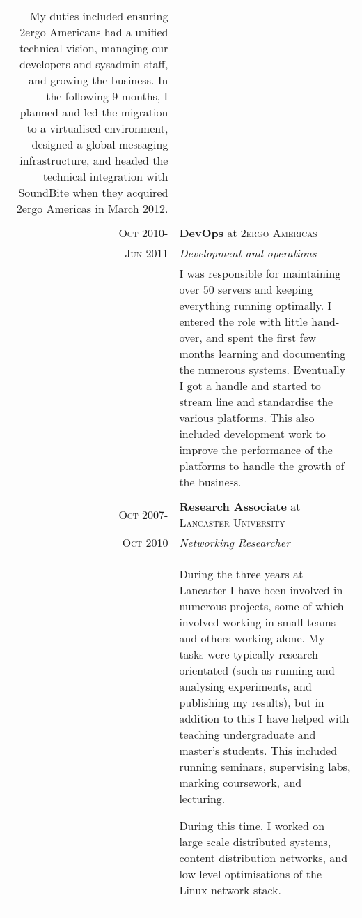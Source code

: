 \documentclass[letterpaper,10pt]{article}
\begin{document}
\begin{tabularx}{\textwidth}{r|X}
                        My duties included ensuring 
			2ergo Americans had a unified technical vision, managing our developers and sysadmin staff, and growing the business.
			In the following 9 months, I planned and led the migration to a virtualised environment, designed a global messaging
			infrastructure, and headed the technical integration with SoundBite when they acquired 2ergo Americas in March 2012. \\
&\\
 \textsc{Oct 2010-} & \textbf{DevOps} at \textsc{2ergo Americas} \\
 \textsc{Jun 2011}  & \emph{Development and operations}\\
                    & I was responsible for maintaining over 50 servers and keeping everything running optimally. 
			I entered the role with little hand-over, and spent the first few months learning and documenting the numerous systems.
			Eventually I got a handle and started to stream line and standardise the various platforms. This also included 
			development work to improve the performance of the platforms to handle the growth of the business. \\
&\\
 \textsc{Oct 2007-} & \textbf{Research Associate} at \textsc{Lancaster University} \\
 \textsc{Oct 2010}  & \emph{Networking Researcher}\\
                    & During the three years at Lancaster I have been involved in numerous projects, some of which involved working in small teams and
			others working alone. My tasks were typically research orientated (such as running and analysing experiments, and publishing my 
			results), but in addition to this I have helped with teaching undergraduate and master's students. This included running seminars,
			supervising labs, marking coursework, and lecturing.

			During this time, I worked on large scale distributed systems, content distribution networks, and low level optimisations of the Linux
			network stack.
			\\


\end{tabularx}

\end{document}
